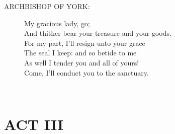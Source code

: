 \documentclass{article}
\begin{document}
\begin{description}
\item[ARCHBISHOP OF YORK:] 
\hspace{1pt}My gracious lady, go;\\
\hspace{1pt}And thither bear your treasure and your goods.\\
\hspace{1pt}For my part, I'll resign unto your grace\\
\hspace{1pt}The seal I keep: and so betide to me\\
\hspace{1pt}As well I tender you and all of yours!\\
\hspace{1pt}Come, I'll conduct you to the sanctuary.\\
\end{description}
\centering{\it [Exeunt]}\\
\section*{ACT III}
\end{document}
